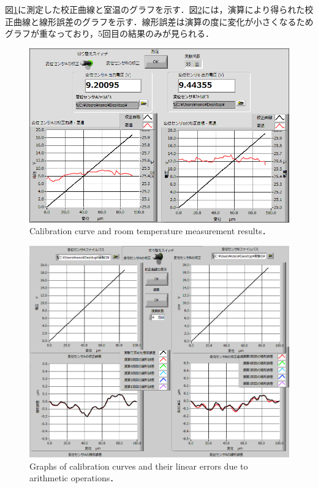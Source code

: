 図\ref{fig:測定結果}に測定した校正曲線と室温のグラフを示す．図\ref{fig:演算結果}には，演算により得られた校正曲線と線形誤差のグラフを示す．線形誤差は演算の度に変化が小さくなるためグラフが重なっており，5回目の結果のみが見られる．
\begin{figure}[htbp]
    \centering %
    \includegraphics[width=100truemm,clip]{fig/測定結果_D.png}
    \caption{Calibration curve and room temperature measurement results．}
    \label{fig:測定結果}
\end{figure}
\begin{figure}[htbp]
    \centering %
    \includegraphics[width=100truemm,clip]{fig/演算結果_A.png}
    \caption{Graphs of calibration curves and their linear errors due to arithmetic operations．}
    \label{fig:演算結果}
\end{figure}